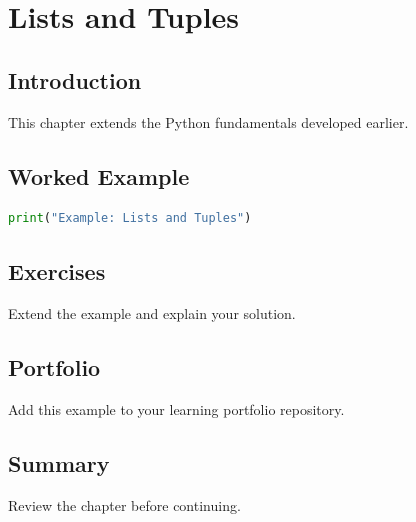 \chapter{Lists and Tuples}
\label{chap:vol3-11}



\section{Introduction}
This chapter extends the Python fundamentals developed earlier.

\section{Worked Example}
\begin{lstlisting}[language=Python]
print("Example: Lists and Tuples")
\end{lstlisting}

\section{Exercises}
\begin{exercise}
Extend the example and explain your solution.
\end{exercise}

\section{Portfolio}
Add this example to your learning portfolio repository.

\section{Summary}
Review the chapter before continuing.
